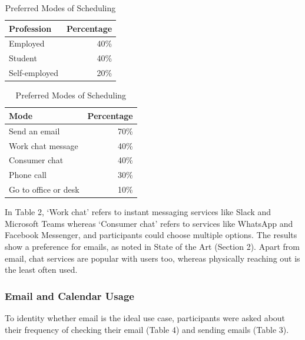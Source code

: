 \documentclass{article}
\begin{document}
\begin{table}[!htb]
    \begin{minipage}{.5\linewidth}
   	 \caption{Professions of Participants}
      \centering
        \begin{tabular}{lr}
	        \hline
            \textbf{Profession} & \textbf{Percentage} \\
            \hline
            Employed & 40\% \\
            Student & 40\% \\
            Self-employed & 20\% \\
            \hline
        \end{tabular}
    \end{minipage}%
    \hspace{.1cm}
    \begin{minipage}{.5\linewidth}
      \centering
	    \caption{Preferred Modes of Scheduling}
        \begin{tabular}{lr}
	        \hline
            \textbf{Mode} & \textbf{Percentage} \\
            \hline
            Send an email & 70\% \\
            Work chat message & 40\% \\
            Consumer chat & 40\% \\
            Phone call & 30\% \\
            Go to office or desk & 10\% \\
            \hline
        \end{tabular}
    \end{minipage} 
\end{table}

In Table 2, `Work chat' refers to instant messaging services like Slack and Microsoft Teams whereas `Consumer chat' refers to services like WhatsApp and Facebook Messenger, and participants could choose multiple options. The results show a preference for emails, as noted in State of the Art (Section 2). Apart from email, chat services are popular with users too, whereas physically reaching out is the least often used.

\subsubsection{Email and Calendar Usage}

To identity whether email is the ideal use case, participants were asked about their frequency of checking their email (Table 4) and sending emails (Table 3).
\end{document}
